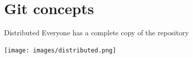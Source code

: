 \documentclass{beamer}
\begin{document}

\section{Git concepts}
\begin{frame}{Distributed}
  Everyone has a complete copy of the repository
  \begin{center}
    \texttt{[image: images/distributed.png]}
  \end{center}
\end{frame}
\end{document}
